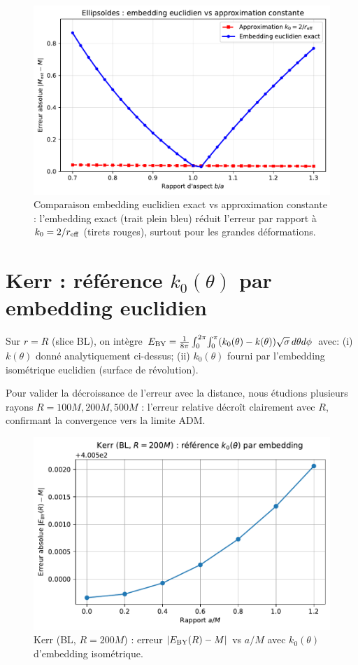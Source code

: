 \documentclass[11pt]{article}
\begin{document}
\begin{figure}[!htb]
\centering
\includegraphics[width=.75\linewidth]{fig_ellipsoids_embedding_comparison.pdf}
\caption{Comparaison embedding euclidien exact vs approximation constante : l'embedding exact (trait plein bleu) r\'eduit l'erreur par rapport \`a $k_0=2/r_{\rm eff}$ (tirets rouges), surtout pour les grandes d\'eformations.}
\end{figure}
\clearpage

\section{Kerr : r\'ef\'erence $k_0(\theta)$ par embedding euclidien}
Sur $r=R$ (slice BL), on int\`egre $E_{\rm BY}=\frac{1}{8\pi}\int_0^{2\pi}\!\int_0^\pi (k_0(\theta)-k(\theta))\sqrt{\sigma}\, d\theta d\phi$ avec:
(i) $k(\theta)$ donn\'e analytiquement ci-dessus; 
(ii) $k_0(\theta)$ fourni par l'embedding isom\'etrique euclidien (surface de r\'evolution).

Pour valider la d\'ecroissance de l'erreur avec la distance, nous \'etudions plusieurs rayons $R = 100M, 200M, 500M$ : l'erreur relative d\'ecro\^it clairement avec $R$, confirmant la convergence vers la limite ADM.

\begin{figure}[!htb]
\centering
\includegraphics[width=.75\linewidth]{fig_kerr_embedding_refined.pdf}
\caption{Kerr (BL, $R=200M$) : erreur $|E_{\rm BY}(R)-M|$ vs $a/M$ avec $k_0(\theta)$ d'embedding isom\'etrique.}
\end{figure}
\end{document}
